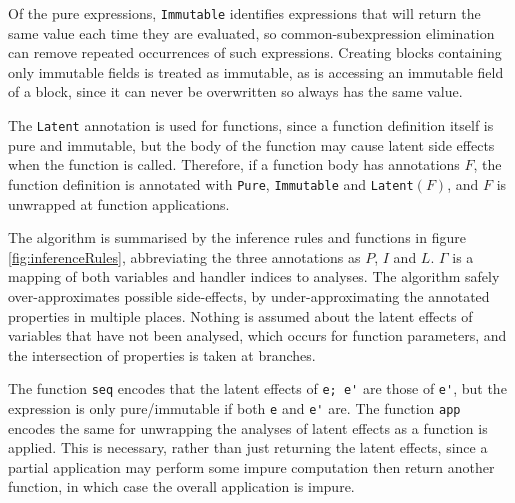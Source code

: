 Of the pure expressions, \verb|Immutable| identifies expressions that will return the same value each time they are evaluated, so common-subexpression elimination can remove repeated occurrences of such expressions. Creating blocks containing only immutable fields is treated as immutable, as is accessing an immutable field of a block, since it can never be overwritten so always has the same value.

The \verb|Latent| annotation is used for functions, since a function definition itself is pure and immutable, but the body of the function may cause latent side effects when the function is called. Therefore, if a function body has annotations $F$, the function definition is annotated with \verb|Pure|, \verb|Immutable| and \verb|Latent|$(F)$, and $F$ is unwrapped at function applications.


The algorithm is summarised by the inference rules and functions in figure \ref{fig:inferenceRules}, abbreviating the three annotations as $P$, $I$ and $L$. $\Gamma$ is a mapping of both variables and handler indices to analyses. 
The algorithm safely over-approximates possible side-effects, by under-approximating the annotated properties in multiple places. 
Nothing is assumed about the latent effects of variables that have not been analysed, which occurs for function parameters,
 and the intersection of properties is taken at branches.

The function \verb|seq| encodes that the latent effects of \verb|e; e'| are those of \verb|e'|, but the expression is only pure/immutable if both \verb|e| and \verb|e'| are. The function \verb|app| encodes the same for unwrapping the analyses of latent effects as a function is applied. This is necessary, rather than just returning the latent effects, since a partial application may perform some impure computation then return another function, in which case the overall application is impure.


